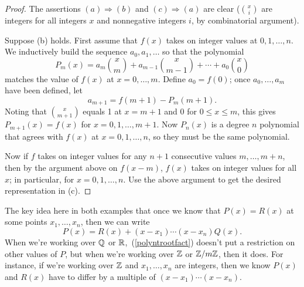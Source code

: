 \begin{proof}
The assertions $(a)\Rightarrow (b)$ and $(c)\Rightarrow (a)$ are clear ($\binom{x}{i}$ are integers for all integers $x$ and nonnegative integers $i$, by combinatorial argument).

Suppose (b) holds. First assume that $f(x)$ takes on integer values at $0,1,\ldots, n$. We inductively build the sequence $a_0,a_1,\ldots$ so that the polynomial \[P_m(x)=a_m\binom xm + a_{m-1}\binom x{m-1} + \cdots+a_0\binom x0\] matches the value of $f(x)$ at $x=0,\ldots,m$. Define $a_0=f(0)$; once $a_0,\ldots, a_m$ have been defined, let 
\[a_{m+1}=f(m+1)-P_m(m+1).\]
Noting that $\binom{x}{m+1}$ equals 1 at $x=m+1$ and 0 for $0\leq x\leq m$, this gives $P_{m+1}(x)=f(x)$ for $x=0,1,\ldots, m+1$. Now $P_n(x)$ is a degree $n$ polynomial that agrees with $f(x)$ at $x=0,1,\ldots, n$, so they must be the same polynomial.

Now if $f$ takes on integer values for any $n+1$ consecutive values $m,\ldots,m+n$, then by the argument above on $f(x-m)$, $f(x)$ takes on integer values for all $x$; in particular, for $x=0,1,\ldots, n$. Use the above argument to get the desired representation in (c).
\end{proof}
The key idea here in both examples that once we know that $P(x)=R(x)$ at some points $x_1,\ldots, x_n$, then we can write 
\begin{equation}\label{polyntrootfact}
P(x)=R(x)+(x-x_1)\cdots (x-x_n)Q(x).
\end{equation}
When we're working over $\mathbb{Q}$ or $\mathbb{R}$,~(\ref{polyntrootfact}) doesn't put a restriction on other values of $P$, but when we're working over $\mathbb{Z}$ or $\mathbb{Z}/m\mathbb{Z}$, then it does. For instance, if we're working over $\mathbb{Z}$ and $x_1,\ldots, x_n$ are integers, then we know $P(x)$ and $R(x)$ have to differ by a multiple of $(x-x_1)\cdots (x-x_n)$. %


